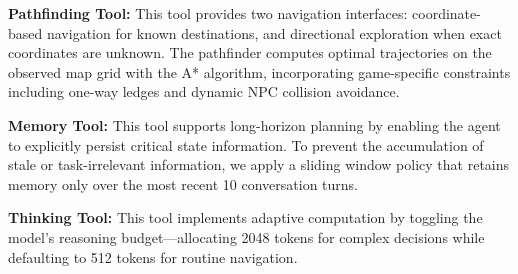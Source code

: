 \textbf{Pathfinding Tool:} This tool provides two navigation interfaces: coordinate-based navigation for known destinations, and directional exploration when exact coordinates are unknown. The pathfinder computes optimal trajectories on the observed map grid with the A* algorithm, incorporating game-specific constraints including one-way ledges and dynamic NPC collision avoidance.

\textbf{Memory Tool:} This tool supports long-horizon planning by enabling the agent to explicitly persist critical state information. To prevent the accumulation of stale or task-irrelevant information, we apply a sliding window policy that retains memory only over the most recent 10 conversation turns.

\textbf{Thinking Tool:} This tool implements adaptive computation by toggling the model's reasoning budget---allocating 2048 tokens for complex decisions while defaulting to 512 tokens for routine navigation.
